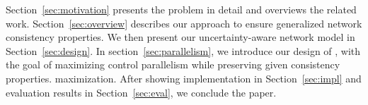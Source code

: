 \fi
%
Section~\ref{sec:motivation} presents the problem in detail and overviews the
related work.  Section~\ref{sec:overview} describes our approach to ensure
generalized network consistency properties.  We then present our
uncertainty-aware network model in Section~\ref{sec:design}.  In
section~\ref{sec:parallelism}, we introduce our design of \name, with the goal of
maximizing control parallelism while preserving given consistency properties.
maximization.  After showing implementation in Section~\ref{sec:impl} and
evaluation results in Section~\ref{sec:eval}, we conclude the paper.  
\fi 

